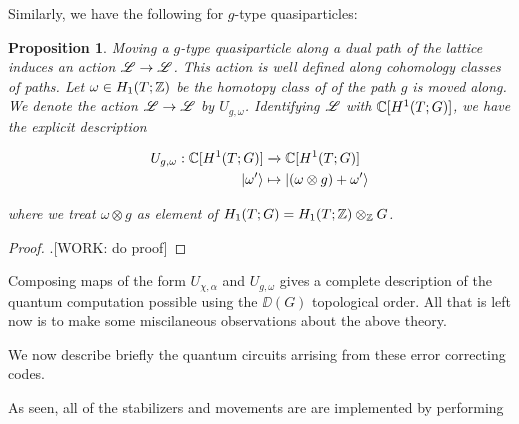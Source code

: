 \documentclass{article}
\newtheorem{proposition}{Proposition}
\theoremstyle{definition}
\numberwithin{figure}{section}
\begin{document}
Similarly, we have the following for $g$-type quasiparticles:

\begin{proposition} Moving a $g$-type quasiparticle along a dual path of the lattice induces an action $\mathscr{L}\to \mathscr{L}$. This action is well defined along cohomology classes of paths. Let $\omega \in H_1(T;\mathbb{Z})$ be the homotopy class of of the path $g$ is moved along. We denote the action $\mathscr{L}\to \mathscr{L}$ by $U_{g,\omega}$. Identifying $\mathscr{L}$ with $\mathbb{C}[H^1(T;G)]$, we have the explicit description

\begin{align*}
U_{g,\omega}: \mathbb{C}[H^1(T;G)]&\xrightarrow{}\mathbb{C}[H^1(T;G)]\\
\left|\omega'\right>&\mapsto \left|(\omega\otimes g)+\omega'\right>
\end{align*}

where we treat $\omega\otimes g$ as element of $H_1(T;G)=H_1(T;\mathbb{Z})\otimes_{\mathbb{Z}} G$.
\end{proposition}
\begin{proof}.[WORK: do proof]
\end{proof}

Composing maps of the form $U_{\chi,\alpha}$ and $U_{g,\omega}$ gives a complete description of the quantum computation possible using the $\DD(G)$ topological order. All that is left now is to make some miscilaneous observations about the above theory.

We now describe briefly the quantum circuits arrising from these error correcting codes.

As seen, all of the stabilizers and movements are are implemented by performing 



\end{document}
